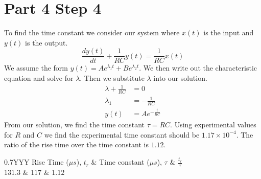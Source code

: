 \documentclass[a4paper, 10pt]{article}
\begin{document}
\section*{Part 4 Step 4}
To find the time constant we consider our system where $x(t)$ is the input and $y(t)$ is the output.
\begin{equation*}
	\frac{dy(t)}{dt} + \frac{1}{RC}y(t) = \frac{1}{RC}x(t)
\end{equation*}
We assume the form $y(t) = Ae^{\lambda_{1}t} + Be^{\lambda_{2}t}$. We then write out the characteristic equation and solve for $\lambda$. Then we substitute $\lambda$ into our solution.
\begin{align*}
	\lambda + \frac{1}{RC} & = 0\\
	\lambda_{1} & = -\frac{1}{RC}\\
	y(t) & = Ae^{-\frac{t}{RC}}
\end{align*}
From our solution, we find the time constant $\tau = RC$. Using experimental values for $R$ and $C$ we find the experimental time constant should be $1.17\times10^{-4}$. The ratio of the rise time over the time constant is $1.12$.
\begin{table}[H]
	\centering
	\begin{tabularx}{0.7\linewidth}{YYY}
		Rise Time ($\mu s$), $t_r$ & Time constant ($\mu s$), $\tau$ & $\frac{t_r}{\tau}$\\
		$131.3$ & $117$ & $1.12$
	\end{tabularx}
	\caption{Experimental rise time, time constant, and ratio of rise time and time constant.}
	\label{tab:scope_rise_time}
\end{table}
\end{document}
